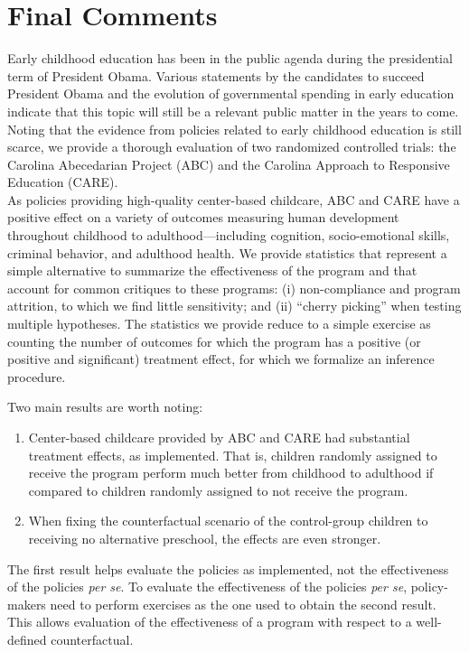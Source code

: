 \section{Final Comments} \label{section:conclusion}

\noindent Early childhood education has been in the public agenda during the presidential term of President Obama. Various statements by the candidates to succeed President Obama and the evolution of governmental spending in early education indicate that this topic will still be a relevant public matter in the years to come.\\ 

\noindent Noting that the evidence from policies related to early childhood education is still scarce, we provide a thorough evaluation of two randomized controlled trials: the Carolina Abecedarian Project (ABC) and the Carolina Approach to Responsive Education (CARE).\\ 

\noindent As policies providing high-quality center-based childcare, ABC and CARE have a positive effect on a variety of outcomes measuring human development throughout childhood to adulthood---including cognition, socio-emotional skills, criminal behavior, and adulthood health. We provide statistics that represent a simple alternative to summarize the effectiveness of the program and that account for common critiques to these programs: (i) non-compliance and program attrition, to which we find little sensitivity; and (ii) ``cherry picking'' when testing multiple hypotheses. The statistics we provide reduce to a simple exercise as counting the number of outcomes for which the program has a positive (or positive and significant) treatment effect, for which we formalize an inference procedure.

\noindent Two main results are worth noting: 

\begin{enumerate}

\item Center-based childcare provided by ABC and CARE had substantial treatment effects, as implemented. That is, children randomly assigned to receive the program perform much better from childhood to adulthood if compared to children randomly assigned to not receive the program.

\item When fixing the counterfactual scenario of the control-group children to receiving no alternative preschool, the effects are even stronger. 

\end{enumerate}

\noindent The first result helps evaluate the policies as implemented, not the effectiveness of the policies \textit{per se}. To evaluate the effectiveness of the policies \textit{per se}, policy-makers need to perform exercises as the one used to obtain the second result. This allows evaluation of the effectiveness of a program with respect to a well-defined counterfactual. 

\singlespace



 